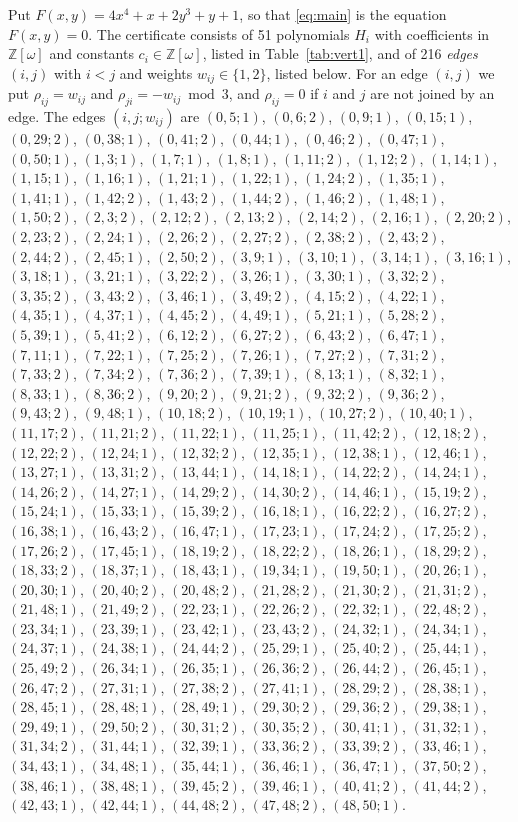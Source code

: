 \documentclass[11pt]{article}
\newcommand{\Z}{\mathbb{Z}}
\begin{document}
Put $F(x,y)=4x^{4}+x+2y^{3}+y+1$, so that \eqref{eq:main} is the equation $F(x,y)=0$. The certificate consists of 51 polynomials $H_i$ with coefficients in $\Z[\omega]$ and constants $c_i\in\Z[\omega]$, listed in Table~\ref{tab:vert1}, and of 216 \emph{edges} $(i,j)$ with $i<j$ and weights $w_{ij}\in\{1,2\}$, listed below. For an edge $(i,j)$ we put $\rho_{ij}=w_{ij}$ and $\rho_{ji}=-w_{ij}\bmod 3$, and $\rho_{ij}=0$ if $i$ and $j$ are not joined by an edge.
The edges $(i,j;w_{ij})$ are $(0,5;1)$, $(0,6;2)$, $(0,9;1)$, $(0,15;1)$, $(0,29;2)$, $(0,38;1)$, $(0,41;2)$, $(0,44;1)$, $(0,46;2)$, $(0,47;1)$, $(0,50;1)$, $(1,3;1)$, $(1,7;1)$, $(1,8;1)$, $(1,11;2)$, $(1,12;2)$, $(1,14;1)$, $(1,15;1)$, $(1,16;1)$, $(1,21;1)$, $(1,22;1)$, $(1,24;2)$, $(1,35;1)$, $(1,41;1)$, $(1,42;2)$, $(1,43;2)$, $(1,44;2)$, $(1,46;2)$, $(1,48;1)$, $(1,50;2)$, $(2,3;2)$, $(2,12;2)$, $(2,13;2)$, $(2,14;2)$, $(2,16;1)$, $(2,20;2)$, $(2,23;2)$, $(2,24;1)$, $(2,26;2)$, $(2,27;2)$, $(2,38;2)$, $(2,43;2)$, $(2,44;2)$, $(2,45;1)$, $(2,50;2)$, $(3,9;1)$, $(3,10;1)$, $(3,14;1)$, $(3,16;1)$, $(3,18;1)$, $(3,21;1)$, $(3,22;2)$, $(3,26;1)$, $(3,30;1)$, $(3,32;2)$, $(3,35;2)$, $(3,43;2)$, $(3,46;1)$, $(3,49;2)$, $(4,15;2)$, $(4,22;1)$, $(4,35;1)$, $(4,37;1)$, $(4,45;2)$, $(4,49;1)$, $(5,21;1)$, $(5,28;2)$, $(5,39;1)$, $(5,41;2)$, $(6,12;2)$, $(6,27;2)$, $(6,43;2)$, $(6,47;1)$, $(7,11;1)$, $(7,22;1)$, $(7,25;2)$, $(7,26;1)$, $(7,27;2)$, $(7,31;2)$, $(7,33;2)$, $(7,34;2)$, $(7,36;2)$, $(7,39;1)$, $(8,13;1)$, $(8,32;1)$, $(8,33;1)$, $(8,36;2)$, $(9,20;2)$, $(9,21;2)$, $(9,32;2)$, $(9,36;2)$, $(9,43;2)$, $(9,48;1)$, $(10,18;2)$, $(10,19;1)$, $(10,27;2)$, $(10,40;1)$, $(11,17;2)$, $(11,21;2)$, $(11,22;1)$, $(11,25;1)$, $(11,42;2)$, $(12,18;2)$, $(12,22;2)$, $(12,24;1)$, $(12,32;2)$, $(12,35;1)$, $(12,38;1)$, $(12,46;1)$, $(13,27;1)$, $(13,31;2)$, $(13,44;1)$, $(14,18;1)$, $(14,22;2)$, $(14,24;1)$, $(14,26;2)$, $(14,27;1)$, $(14,29;2)$, $(14,30;2)$, $(14,46;1)$, $(15,19;2)$, $(15,24;1)$, $(15,33;1)$, $(15,39;2)$, $(16,18;1)$, $(16,22;2)$, $(16,27;2)$, $(16,38;1)$, $(16,43;2)$, $(16,47;1)$, $(17,23;1)$, $(17,24;2)$, $(17,25;2)$, $(17,26;2)$, $(17,45;1)$, $(18,19;2)$, $(18,22;2)$, $(18,26;1)$, $(18,29;2)$, $(18,33;2)$, $(18,37;1)$, $(18,43;1)$, $(19,34;1)$, $(19,50;1)$, $(20,26;1)$, $(20,30;1)$, $(20,40;2)$, $(20,48;2)$, $(21,28;2)$, $(21,30;2)$, $(21,31;2)$, $(21,48;1)$, $(21,49;2)$, $(22,23;1)$, $(22,26;2)$, $(22,32;1)$, $(22,48;2)$, $(23,34;1)$, $(23,39;1)$, $(23,42;1)$, $(23,43;2)$, $(24,32;1)$, $(24,34;1)$, $(24,37;1)$, $(24,38;1)$, $(24,44;2)$, $(25,29;1)$, $(25,40;2)$, $(25,44;1)$, $(25,49;2)$, $(26,34;1)$, $(26,35;1)$, $(26,36;2)$, $(26,44;2)$, $(26,45;1)$, $(26,47;2)$, $(27,31;1)$, $(27,38;2)$, $(27,41;1)$, $(28,29;2)$, $(28,38;1)$, $(28,45;1)$, $(28,48;1)$, $(28,49;1)$, $(29,30;2)$, $(29,36;2)$, $(29,38;1)$, $(29,49;1)$, $(29,50;2)$, $(30,31;2)$, $(30,35;2)$, $(30,41;1)$, $(31,32;1)$, $(31,34;2)$, $(31,44;1)$, $(32,39;1)$, $(33,36;2)$, $(33,39;2)$, $(33,46;1)$, $(34,43;1)$, $(34,48;1)$, $(35,44;1)$, $(36,46;1)$, $(36,47;1)$, $(37,50;2)$, $(38,46;1)$, $(38,48;1)$, $(39,45;2)$, $(39,46;1)$, $(40,41;2)$, $(41,44;2)$, $(42,43;1)$, $(42,44;1)$, $(44,48;2)$, $(47,48;2)$, $(48,50;1)$.
\end{document}
